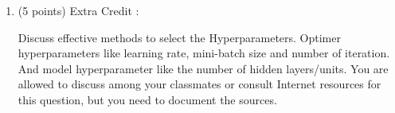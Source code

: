 \documentclass[12pt,epsf]{article}
\begin{document}
\begin{enumerate}
\begin{enumerate}
\end{enumerate}








\item (5 points) Extra Credit : 

Discuss effective methods to select the Hyperparameters. Optimer hyperparameters like learning rate, mini-batch size and number of iteration. And model hyperparameter like the number of hidden layers/units. You are allowed to discuss among your classmates or consult Internet resources for this question, but you need to document the sources.


\end{enumerate}
\end{document}
